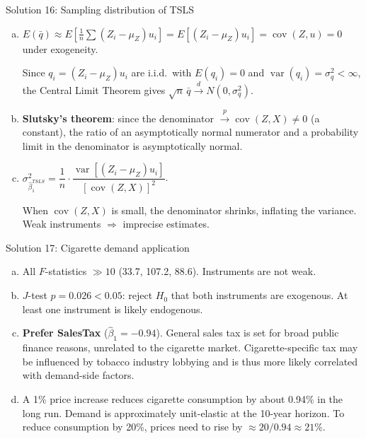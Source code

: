 \documentclass[10pt]{beamer}
\begin{document}
\begin{frame}{Solution 16: Sampling distribution of TSLS}
\label{s16}
\begin{enumerate}[(a)]
  \item $E(\bar{q}) \approx E\!\left[\frac{1}{n}\sum(Z_i - \mu_Z)u_i\right] = E[(Z_i - \mu_Z)u_i] = \operatorname{cov}(Z,u) = 0$ under exogeneity.

  Since $q_i = (Z_i - \mu_Z)u_i$ are i.i.d.\ with $E(q_i) = 0$ and $\operatorname{var}(q_i) = \sigma_q^2 < \infty$, the \alert{Central Limit Theorem} gives $\sqrt{n}\,\bar{q} \xrightarrow{d} N(0, \sigma_q^2)$.

  \item \textbf{Slutsky's theorem}: since the denominator $\xrightarrow{p} \operatorname{cov}(Z,X) \neq 0$ (a constant), the ratio of an asymptotically normal numerator and a probability limit in the denominator is asymptotically normal.

  \item $\sigma_{\widehat{\beta}_1^{TSLS}}^2 = \dfrac{1}{n} \cdot \dfrac{\operatorname{var}[(Z_i - \mu_Z)u_i]}{[\operatorname{cov}(Z,X)]^2}$.

  When $\operatorname{cov}(Z,X)$ is small, the denominator shrinks, inflating the variance. Weak instruments $\Rightarrow$ \alert{imprecise} estimates.
\end{enumerate}

\vfill
\hfill\hyperlink{q16}{}
\end{frame}

\begin{frame}{Solution 17: Cigarette demand application}
\label{s17}
\begin{enumerate}[(a)]
  \item All $F$-statistics $\gg 10$ (33.7, 107.2, 88.6). Instruments are \alert{not weak}.

  \item $J$-test $p = 0.026 < 0.05$: reject $H_0$ that both instruments are exogenous. At least one instrument is likely endogenous.

  \item \textbf{Prefer SalesTax} ($\widehat{\beta}_1 = -0.94$). General sales tax is set for broad public finance reasons, unrelated to the cigarette market. Cigarette-specific tax may be influenced by tobacco industry lobbying and is thus more likely correlated with demand-side factors.

  \item A 1\% price increase reduces cigarette consumption by about 0.94\% in the long run. Demand is approximately unit-elastic at the 10-year horizon. To reduce consumption by 20\%, prices need to rise by $\approx 20/0.94 \approx 21\%$.
\end{enumerate}

\vfill
\hfill\hyperlink{q17}{}
\end{frame}
\end{document}
